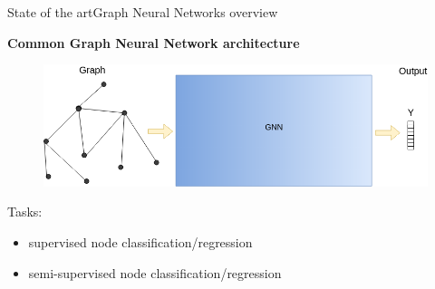 \documentclass[xcolor=table]{beamer}
\begin{document}
\begin{frame}{State of the art}{Graph Neural Networks overview}

\textbf{Common Graph Neural Network architecture}
\begin{figure}
    \includegraphics[scale=0.37]{./img/GNN_explanation_01.png}
\end{figure}



\vspace{-10px}
Tasks:
\begin{itemize}
    \item supervised node classification/regression
    \item semi-supervised node classification/regression
\end{itemize}



\end{frame}
\end{document}
